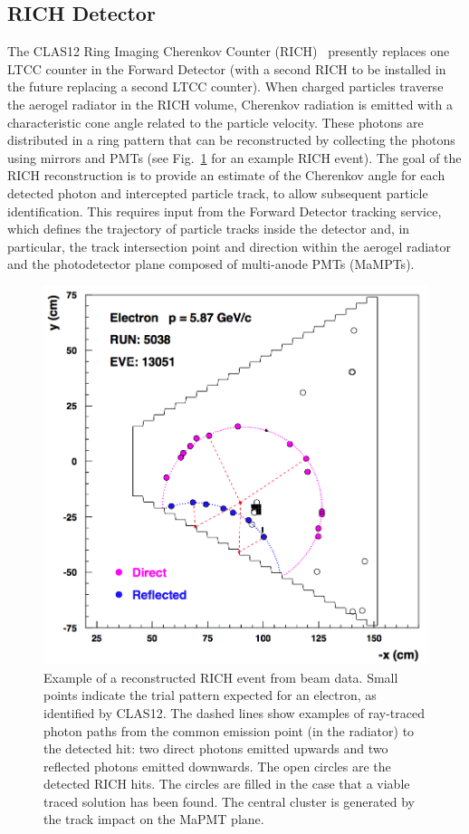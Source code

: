 \subsection{RICH Detector}

The CLAS12 Ring Imaging Cherenkov Counter (RICH)~\cite{rich-nim} presently replaces one LTCC counter in the
Forward Detector (with a second RICH to be installed in the future replacing a second LTCC counter). When charged
particles traverse the aerogel radiator in the RICH volume, Cherenkov radiation is emitted with a characteristic cone
angle related to the particle velocity. These photons are distributed in a ring pattern that can be reconstructed by
collecting the photons using mirrors and PMTs (see Fig.~\ref{Fig:RayShow} for an example RICH event). The goal of
the RICH reconstruction is to provide an estimate of the Cherenkov angle for each detected photon and intercepted
particle track, to allow subsequent particle identification. This requires input from the Forward Detector tracking
service, which defines the trajectory of particle tracks inside the detector and, in particular, the track intersection
point and direction within the aerogel radiator and the photodetector plane composed of multi-anode PMTs (MaMPTs).

\begin{figure}[t]
\begin{center}
\includegraphics[width=0.8\columnwidth]{pics/example.png}
\end{center}
\caption{Example of a reconstructed RICH event from beam data. Small points indicate the trial pattern expected
  for an electron, as identified by CLAS12. The dashed lines show examples of ray-traced photon paths from the
  common emission point (in the radiator) to the detected hit: two direct photons emitted upwards and two reflected
  photons emitted downwards. The open circles are the detected RICH hits. The circles are filled in the case that a
  viable traced solution has been found. The central cluster is generated by the track impact on the MaPMT plane.}
\label{Fig:RayShow}
\end{figure}

